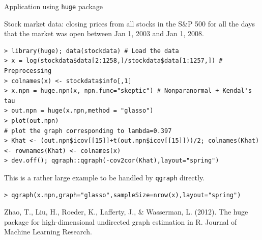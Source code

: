 \documentclass[11pt,handout,aspectratio=169,dvipsnames]{beamer}
\begin{document}
\begin{frame}[fragile]{Application using \texttt{huge} package}

{\small Stock market data: closing prices from all stocks in the S\&P 500 for all the days that the market was open between Jan 1, 2003 and Jan 1, 2008. }
	\begin{lstlisting}
> library(huge); data(stockdata) # Load the data 
> x = log(stockdata$data[2:1258,]/stockdata$data[1:1257,]) # Preprocessing 
> colnames(x) <- stockdata$info[,1]
> x.npn = huge.npn(x, npn.func="skeptic") # Nonparanormal + Kendal's tau
> out.npn = huge(x.npn,method = "glasso")
> plot(out.npn)
# plot the graph corresponding to lambda=0.397
> Khat <- (out.npn$icov[[15]]+t(out.npn$icov[[15]]))/2; colnames(Khat) <- rownames(Khat) <- colnames(x)
> dev.off(); qgraph::qgraph(-cov2cor(Khat),layout="spring")
	\end{lstlisting}
	This is a rather large example to be handled by \texttt{qgraph} directly.
	\begin{lstlisting}
> qgraph(x.npn,graph="glasso",sampleSize=nrow(x),layout="spring")
	\end{lstlisting}

	{\scriptsize Zhao, T., Liu, H., Roeder, K., Lafferty, J., \& Wasserman, L. (2012). The huge package for high-dimensional undirected graph estimation in R. Journal of Machine Learning Research.}
\end{frame}
\end{document}
